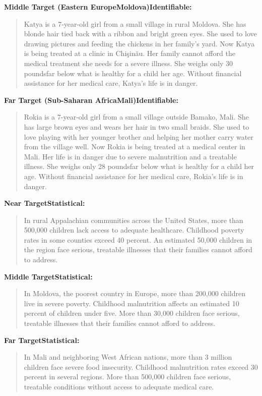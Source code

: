 \textbf{Middle Target (Eastern Europe\textemdash Moldova)\textemdash Identifiable:}
\begin{quote}
Katya is a 7-year-old girl from a small village in rural Moldova. She has blonde hair tied back with a ribbon and bright green eyes. She used to love drawing pictures and feeding the chickens in her family's yard. Now Katya is being treated at a clinic in Chi\c{s}in\u{a}u. Her family cannot afford the medical treatment she needs for a severe illness. She weighs only 30 pounds\textemdash far below what is healthy for a child her age. Without financial assistance for her medical care, Katya's life is in danger.
\end{quote}

\textbf{Far Target (Sub-Saharan Africa\textemdash Mali)\textemdash Identifiable:}
\begin{quote}
Rokia is a 7-year-old girl from a small village outside Bamako, Mali. She has large brown eyes and wears her hair in two small braids. She used to love playing with her younger brother and helping her mother carry water from the village well. Now Rokia is being treated at a medical center in Mali. Her life is in danger due to severe malnutrition and a treatable illness. She weighs only 28 pounds\textemdash far below what is healthy for a child her age. Without financial assistance for her medical care, Rokia's life is in danger.
\end{quote}

\textbf{Near Target\textemdash Statistical:}
\begin{quote}
In rural Appalachian communities across the United States, more than 500,000 children lack access to adequate healthcare. Childhood poverty rates in some counties exceed 40 percent. An estimated 50,000 children in the region face serious, treatable illnesses that their families cannot afford to address.
\end{quote}

\textbf{Middle Target\textemdash Statistical:}
\begin{quote}
In Moldova, the poorest country in Europe, more than 200,000 children live in severe poverty. Childhood malnutrition affects an estimated 10 percent of children under five. More than 30,000 children face serious, treatable illnesses that their families cannot afford to address.
\end{quote}

\textbf{Far Target\textemdash Statistical:}
\begin{quote}
In Mali and neighboring West African nations, more than 3 million children face severe food insecurity. Childhood malnutrition rates exceed 30 percent in several regions. More than 500,000 children face serious, treatable conditions without access to adequate medical care.
\end{quote}

